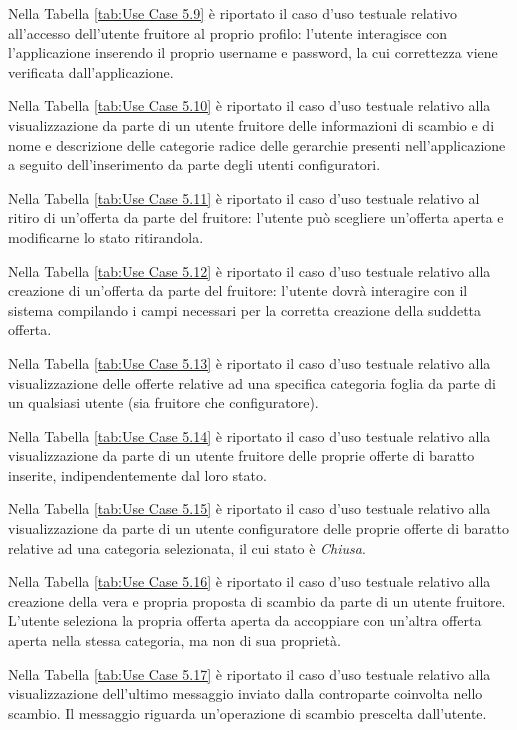 Nella Tabella \ref{tab:Use Case 5.9} è riportato il caso d'uso testuale relativo all'accesso dell'utente fruitore al proprio profilo: l'utente interagisce con l'applicazione inserendo il proprio username e password, la cui correttezza viene verificata dall'applicazione.\bigskip

Nella Tabella \ref{tab:Use Case 5.10} è riportato il caso d'uso testuale relativo alla visualizzazione da parte di un utente fruitore delle informazioni di scambio e di nome e descrizione delle categorie radice delle gerarchie presenti nell'applicazione a seguito dell'inserimento da parte degli utenti configuratori.\bigskip

Nella Tabella \ref{tab:Use Case 5.11} è riportato il caso d'uso testuale relativo al ritiro di un'offerta da parte del fruitore: l'utente può scegliere un'offerta aperta e modificarne lo stato ritirandola.\bigskip

Nella Tabella \ref{tab:Use Case 5.12} è riportato il caso d'uso testuale relativo alla creazione di un'offerta da parte del fruitore: l'utente dovrà interagire con il sistema compilando i campi necessari per la corretta creazione della suddetta offerta.\bigskip

Nella Tabella \ref{tab:Use Case 5.13} è riportato il caso d'uso testuale relativo alla visualizzazione delle offerte relative ad una specifica categoria foglia da parte di un qualsiasi utente (sia fruitore che configuratore).\bigskip

Nella Tabella \ref{tab:Use Case 5.14} è riportato il caso d'uso testuale relativo alla visualizzazione da parte di un utente fruitore delle proprie offerte di baratto inserite, indipendentemente dal loro stato.\bigskip

Nella Tabella \ref{tab:Use Case 5.15} è riportato il caso d'uso testuale relativo alla visualizzazione da parte di un utente configuratore delle proprie offerte di baratto relative ad una categoria selezionata, il cui stato è \textit{Chiusa}.\bigskip

Nella Tabella \ref{tab:Use Case 5.16} è riportato il caso d'uso testuale relativo alla creazione della vera e propria proposta di scambio da parte di un utente fruitore. L'utente seleziona la propria offerta aperta da accoppiare con un'altra offerta aperta nella stessa categoria, ma non di sua proprietà.\bigskip

Nella Tabella \ref{tab:Use Case 5.17} è riportato il caso d'uso testuale relativo alla visualizzazione dell'ultimo messaggio inviato dalla controparte coinvolta nello scambio. Il messaggio riguarda un'operazione di scambio prescelta dall'utente.\bigskip

